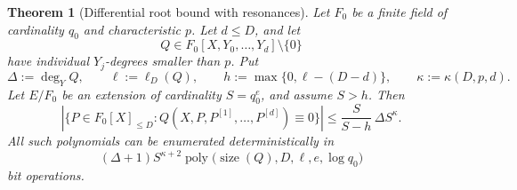 \documentclass[11pt,letterpaper]{article}
\newtheorem{theorem}{Theorem}[section]
\theoremstyle{definition}
\newcommand{\poly}{\operatorname{poly}}
\begin{document}
\begin{theorem}[Differential root bound with resonances]
\label{thm:resonant-root-bound}
Let \(F_0\) be a finite field of cardinality \(q_0\) and characteristic
\(p\).  Let \(d\leq D\), and let
\[
  Q\in F_0[X,Y_0,\ldots,Y_d]\setminus\{0\}
\]
have individual \(Y_j\)-degrees smaller than \(p\).  Put
\begin{equation}
  \Delta:=\deg_YQ,
  \qquad
  \ell:=\ell_D(Q),
  \qquad
  h:=\max\{0,\ell-(D-d)\},
  \qquad
  \kappa:=\kappa(D,p,d).
  \label{eq:resonant-root-parameters}
\end{equation}
Let \(E/F_0\) be an extension of cardinality \(S=q_0^e\), and assume
\(S>h\).  Then
\begin{equation}
  \left|
    \{P\in F_0[X]_{\leq D}:
      Q(X,P,P^{[1]},\ldots,P^{[d]})\equiv0\}
  \right|
  \leq
  \frac{S}{S-h}\,\Delta S^\kappa.
  \label{eq:resonant-root-bound}
\end{equation}
All such polynomials can be enumerated deterministically in
\begin{equation}
  (\Delta+1)S^{\kappa+2}
  \poly\bigl(\operatorname{size}(Q),D,\ell,e,\log q_0\bigr)
  \label{eq:resonant-enumeration-time}
\end{equation}
bit operations.
\end{theorem}
\end{document}
